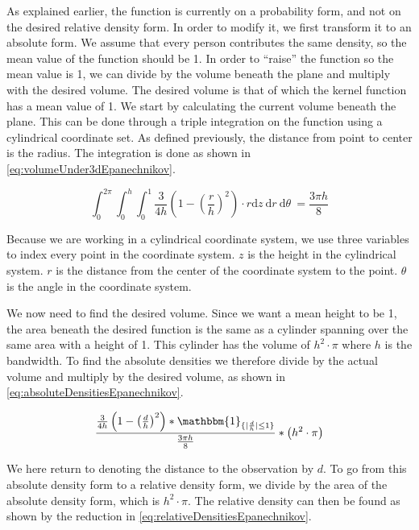 As explained earlier, the function is currently on a probability form, and not on the desired relative density form. In order to modify it, we first transform it to an absolute form. We assume that every person contributes the same density, so the mean value of the function should be 1. In order to \enquote{raise} the function so the mean value is 1, we can divide by the volume beneath the plane and multiply with the desired volume. The desired volume is that of which the kernel function has a mean value of 1. We start by calculating the current volume beneath the plane. This can be done through a triple integration on the function using a cylindrical coordinate set. As defined previously, the distance from point to center is the radius. The integration is done as shown in \cref{eq:volumeUnder3dEpanechnikov}.

\begin{equation}
\label{eq:volumeUnder3dEpanechnikov}
\int_0^{2 \pi} \int_0^h \int_0^1 \frac{3}{4 h} \left(1 - \left(\frac{r}{h}\right)^2\right) \cdot r \mathrm{d}z\ \mathrm{d}r\ \mathrm{d}\theta\ = \frac{3 \pi h}{8}
\end{equation}

Because we are working in a cylindrical coordinate system, we use three variables to index every point in the coordinate system. $z$ is the height in the cylindrical system. $r$ is the distance from the center of the coordinate system to the point. $\theta$ is the angle in the coordinate system.

We now need to find the desired volume. Since we want a mean height to be 1, the area beneath the desired function is the same as a cylinder spanning over the same area with a height of 1. This cylinder has the volume of $h^2 \cdot \pi$ where $h$ is the bandwidth. To find the absolute densities we therefore divide by the actual volume and multiply by the desired volume, as shown in \cref{eq:absoluteDensitiesEpanechnikov}.

\begin{equation}
\label{eq:absoluteDensitiesEpanechnikov}
\frac{\frac{3}{4 h} \left(1 - \left(\frac{d}{h}\right)^2\right) * \mathbbm{1}_{\{|\frac{d}{h}| \leq 1\}}}{\frac{3\pi h}{8}} * \left(h^2 \cdot \pi\right)
\end{equation}

We here return to denoting the distance to the observation by $d$. To go from this absolute density form to a relative density form, we divide by the area of the absolute density form, which is $h^2 \cdot \pi$. The relative density can then be found as shown by the reduction in \cref{eq:relativeDensitiesEpanechnikov}.

